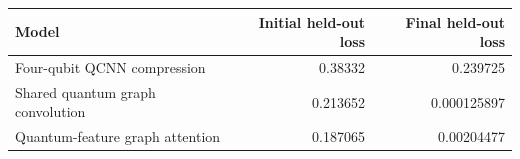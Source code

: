 \begin{center}\small
\begin{tabular}{lrr}\toprule
Model & Initial held-out loss & Final held-out loss\\\midrule
Four-qubit QCNN compression & 0.38332 & 0.239725\\
Shared quantum graph convolution & 0.213652 & 0.000125897\\
Quantum-feature graph attention & 0.187065 & 0.00204477\\
\bottomrule\end{tabular}\end{center}
